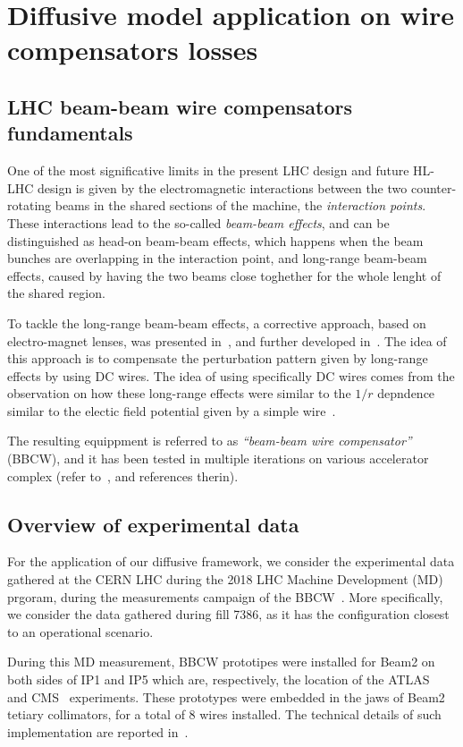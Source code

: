 \chapter{Diffusive model application on wire compensators losses}

\section{LHC beam-beam wire compensators fundamentals}

One of the most significative limits in the present LHC design and future HL-LHC design is given by the electromagnetic interactions between the two counter-rotating beams in the shared sections of the machine, the \textit{interaction points}. These interactions lead to the so-called \textit{beam-beam effects}, and can be distinguished as head-on beam-beam effects, which happens when the beam bunches are overlapping in the interaction point, and long-range beam-beam effects, caused by having the two beams close toghether for the whole lenght of the shared region.

To tackle the long-range beam-beam effects, a corrective approach, based on electro-magnet lenses, was presented in~\cite{}, and further developed in~\cite{}. The idea of this approach is to compensate the perturbation pattern given by long-range effects by using DC wires. The idea of using specifically DC wires comes from the observation on how these long-range effects were similar to the $1/r$ depndence similar to the electic field potential given by a simple wire~\cite{}.

The resulting equippment is referred to as \textit{``beam-beam wire compensator''} (BBCW), and it has been tested in multiple iterations on various accelerator complex (refer to~\cite{}, and references therin).

\section{Overview of experimental data}

For the application of our diffusive framework, we consider the experimental data gathered at the CERN LHC during the 2018 LHC Machine Development (MD) prgoram, during the measurements campaign of the BBCW~\cite{}. More specifically, we consider the data gathered during fill 7386, as it has the configuration closest to an operational scenario.

During this MD measurement, BBCW prototipes were installed for Beam2 on both sides of IP1 and IP5 which are, respectively, the location of the ATLAS~\cite{} and CMS~\cite{} experiments. These prototypes were embedded in the jaws of Beam2 tetiary collimators, for a total of 8 wires installed. The technical details of such implementation are reported in~\cite{}.

